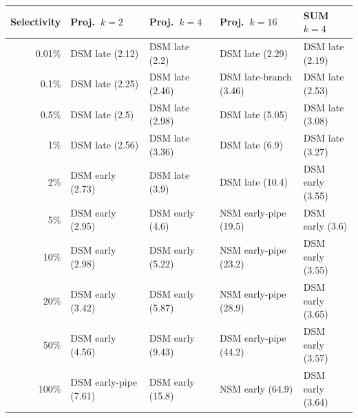 \begin{tabular}{rllll}
\toprule
Selectivity & Proj.\ $k{=}2$ & Proj.\ $k{=}4$ & Proj.\ $k{=}16$ & SUM $k{=}4$ \\
\midrule
0.01\% & DSM late (2.12) & DSM late (2.2) & DSM late (2.29) & DSM late (2.19) \\
0.1\% & DSM late (2.25) & DSM late (2.46) & DSM late-branch (3.46) & DSM late (2.53) \\
0.5\% & DSM late (2.5) & DSM late (2.98) & DSM late (5.05) & DSM late (3.08) \\
1\% & DSM late (2.56) & DSM late (3.36) & DSM late (6.9) & DSM late (3.27) \\
2\% & DSM early (2.73) & DSM late (3.9) & DSM late (10.4) & DSM early (3.55) \\
5\% & DSM early (2.95) & DSM early (4.6) & NSM early-pipe (19.5) & DSM early (3.6) \\
10\% & DSM early (2.98) & DSM early (5.22) & NSM early-pipe (23.2) & DSM early (3.55) \\
20\% & DSM early (3.42) & DSM early (5.87) & NSM early-pipe (28.9) & DSM early (3.65) \\
50\% & DSM early (4.56) & DSM early (9.43) & DSM early-pipe (44.2) & DSM early (3.57) \\
100\% & DSM early-pipe (7.61) & DSM early (15.8) & NSM early (64.9) & DSM early (3.64) \\
\bottomrule
\end{tabular}
